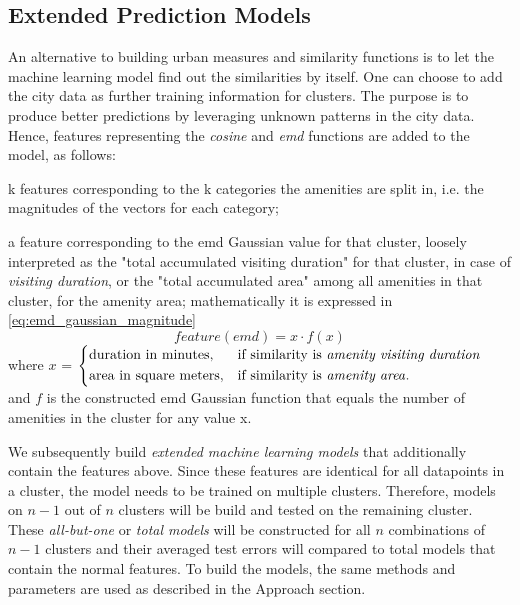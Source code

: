 \documentclass{ws-ijait}
\begin{document}
	\subsection{Extended Prediction Models}
	An alternative to building urban measures and similarity functions is to let the machine learning model find out the similarities by itself. 
	One can choose to add the city data as further training information for clusters. The purpose is to produce better predictions by leveraging unknown patterns in the city data. Hence, features representing the \textit{cosine} and \textit{emd} functions are added to the model, as follows: 
	\begin{romanlist}
		\item k features corresponding to the k categories the amenities are split in, i.e. the magnitudes of the vectors for each category;
		\item a feature corresponding to the emd Gaussian value for that cluster, loosely interpreted as the "total accumulated visiting duration" for that cluster, in case of \textit{visiting duration}, or the "total accumulated area" among all amenities in that cluster, for the amenity area; mathematically it is expressed in \cref{eq:emd_gaussian_magnitude}
		\begin{equation}
		feature(emd)=x \cdot f(x)
		\label{eq:emd_gaussian_magnitude}
		\end{equation}
		{\centering
			where $x$ = 
			$
			\begin{dcases}
			\text{duration in minutes}, & \text{if similarity is \textit{amenity visiting duration}} \\
			\text{area in square meters}, & \text{if similarity is \textit{amenity area}}.
			\end{dcases}
			$ \\
			
			and $f$ is the constructed emd Gaussian function that equals the number of amenities in the cluster for any value x.}
	\end{romanlist}
	
	We subsequently build \textit{extended machine learning models} that additionally contain the features above. Since these features are identical for all datapoints in a cluster, the model needs to be trained on multiple clusters. Therefore, models on $n-1$ out of $n$ clusters will be build and tested on the remaining cluster. These \textit{all-but-one} or \textit{total models} will be constructed for all $n$ combinations of $n-1$ clusters and their averaged test errors will compared to total models that contain the normal features. To build the models, the same methods and parameters are used as described in the Approach section.
	
\end{document}
